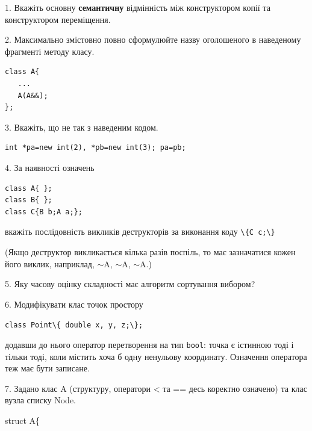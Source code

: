 \documentclass[12pt, ukrainian]{article}
\def\code#1{\Verb!#1!}
\begin{document}
{%
1. Вкажіть основну \textbf{семантичну} відмінність між конструктором копії та конструктором переміщення.%
\par
\vspace{2mm}
2. Максимально змістовно повно сформулюйте назву оголошеного в наведеному фрагменті методу класу.
\vspace{-3mm}
\begin{verbatim}class A{
   ...
   A(A&&);
};\end{verbatim}
\vspace{-3mm}
\par
\vspace{2mm}
3. Вкажіть, що не так з наведеним кодом.
\vspace{-3mm}
\begin{verbatim}int *pa=new int(2), *pb=new int(3); pa=pb;\end{verbatim}
\vspace{-3mm}
\par
\vspace{2mm}
4. За наявності означень
\vspace{-3mm}
\begin{verbatim}
class A{ };
class B{ };
class C{B b;A a;};\end{verbatim}
\vspace{-3mm}
вкажіть послідовність викликів деструкторів за виконання коду \code{\{C c;\}} 

(Якщо деструктор викликається кілька разів поспіль, то має зазначатися кожен його виклик, наприклад, $\sim$A, $\sim$A, $\sim$A.)

\vspace{2mm}
5. Яку часову оцінку складності має алгоритм сортування вибором?
\par
\vspace{2mm}
6. Модифікувати клас точок простору 

\qquad\code{class Point\{ double x, y, z;\};}


додавши до нього оператор перетворення на тип \code{bool}: точка є істинною тоді і тільки тоді, коли містить хоча б одну ненульову координату. Означення оператора теж має бути записане.%
\par
\vspace{2mm}
7. 
Задано клас A (структуру, оператори < та == десь коректно означено) та клас вузла списку Node.

struct A\{

}
\end{document}
